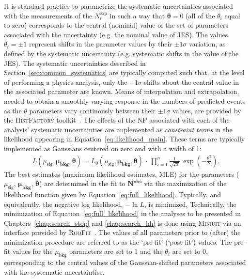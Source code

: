{\color{red}{REORDER THIS TEXT}} It is standard practice to parametrize the systematic uncertainties associated with the measurements
of the $N_r^{\text{exp}}$ in such a way that $\bm{\theta} = 0$ (all of the $\theta_i$ equal to zero) corresponds to the central (nominal) value
of the set of parameters associated with the uncertainty (e.g. the nominal value of JES).
The values $\theta_i = \pm 1$ represent shifts in the parameter values by their $\pm 1\sigma$
variation, as defined by the systematic uncertainty (e.g. systematic shifts in the value of the JES).
The systematic uncertainties described in Section~\ref{sec:common_systematics} are typically
computed such that, at the level of performing a physics analysis, only the $\pm 1 \sigma$ shifts about the central value
in the associated parameter are known.
Means of interpolation and extrapolation, needed to obtain a smoothly varying response in the
numbers of predicted events as the $\theta$ parameters vary continously between their $\pm 1 \sigma$ values,
are provided by the \textsc{HistFactory} toolkit~\cite{HistFactory}.
The effects of the NP associated with each of the analysis' systematic uncertainties
are implemented as \textit{constraint terms} in the likelihood appearing in Equation~\ref{eq:likelihood_main}.
These terms are typically implemented as Gaussians centered on zero and with a width of 1:
\begin{align}
    L(\mu_{\text{sig}}, \bm{\mu_{\text{bkg}}}, \bm{\theta}) = L_0(\mu_{\text{sig}}, \bm{\mu_{\text{bkg}}}, \bm{\theta})
        \, \cdot \, \prod\limits_{i = 1}^{n} \frac{1}{\sqrt{2 \pi}} \, \exp \left( - \frac{\theta_i^2}{2} \right).
    \label{eq:full_likelihood}
\end{align}
The best estimates (maximum likelihood estimates, MLE) for the parameters ($\mu_{\text{sig}}$, $\bm{\mu_{\text{bkg}}}$, $\bm{\theta}$) are determined in the fit to $\bm{N^{\text{obs}}}$ via the maximization
of the likelihood function given by Equation~\ref{eq:full_likelihood}. 
Typically, and equivalently, the negative log likelihood, $-\ln L$, is minimized.
Technically, the minimization of Equation~\ref{eq:full_likelihood} in the analyses to be presented
in Chapters~\ref{chap:search_stop} and \ref{chap:search_hh} is done using \textsc{Miniuit}
via an interface provided by \textsc{RooFit}~\cite{MINUIT,RooFitI}.
The values of all parameters prior to (after) the minimization procedure are referred to as the
`pre-fit' (`post-fit') values.
The pre-fit values for the $\mu_{\text{bkg}}$ parameters are set to 1 and the $\theta_i$ are set to $0$, corresponding
to the central values of the Gaussian-shifted parameters associated with the systematic uncertainties.

